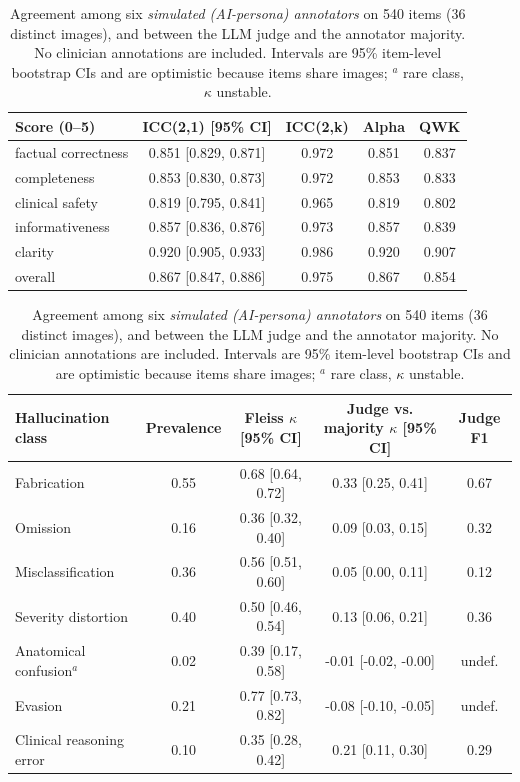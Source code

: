 \begin{table}[t]
\centering
\small
\begin{tabular}{lcccc}
\toprule
Score (0--5) & ICC(2,1) [95\% CI] & ICC(2,k) & Alpha & QWK \\
\midrule
factual correctness & 0.851 [0.829, 0.871] & 0.972 & 0.851 & 0.837 \\
completeness & 0.853 [0.830, 0.873] & 0.972 & 0.853 & 0.833 \\
clinical safety & 0.819 [0.795, 0.841] & 0.965 & 0.819 & 0.802 \\
informativeness & 0.857 [0.836, 0.876] & 0.973 & 0.857 & 0.839 \\
clarity & 0.920 [0.905, 0.933] & 0.986 & 0.920 & 0.907 \\
overall & 0.867 [0.847, 0.886] & 0.975 & 0.867 & 0.854 \\
\bottomrule
\end{tabular}
\par\medskip
\small
\begin{tabular}{lcccc}
\toprule
Hallucination class & Prevalence & Fleiss $\kappa$ [95\% CI] & Judge vs. majority $\kappa$ [95\% CI] & Judge F1 \\
\midrule
Fabrication & 0.55 & 0.68 [0.64, 0.72] & 0.33 [0.25, 0.41] & 0.67 \\
Omission & 0.16 & 0.36 [0.32, 0.40] & 0.09 [0.03, 0.15] & 0.32 \\
Misclassification & 0.36 & 0.56 [0.51, 0.60] & 0.05 [0.00, 0.11] & 0.12 \\
Severity distortion & 0.40 & 0.50 [0.46, 0.54] & 0.13 [0.06, 0.21] & 0.36 \\
Anatomical confusion$^{a}$ & 0.02 & 0.39 [0.17, 0.58] & -0.01 [-0.02, -0.00] & undef. \\
Evasion & 0.21 & 0.77 [0.73, 0.82] & -0.08 [-0.10, -0.05] & undef. \\
Clinical reasoning error & 0.10 & 0.35 [0.28, 0.42] & 0.21 [0.11, 0.30] & 0.29 \\
\bottomrule
\end{tabular}
\caption{Agreement among six \emph{simulated (AI-persona) annotators} on 540 items (36 distinct images), and between the LLM judge and the annotator majority. No clinician annotations are included. Intervals are 95\% item-level bootstrap CIs and are optimistic because items share images; $^{a}$ rare class, $\kappa$ unstable.}
\label{tab:annotation}
\end{table}
